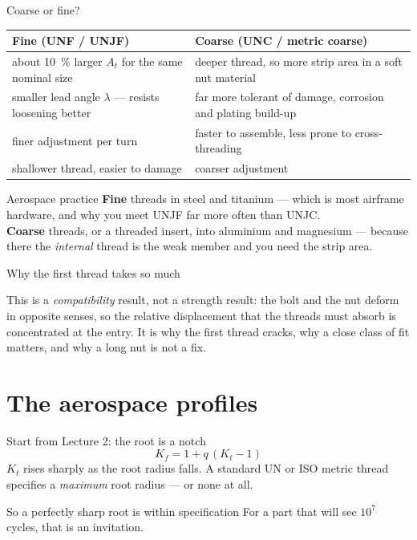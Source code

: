 \documentclass[aspectratio=169,10pt]{beamer}
\begin{document}
\begin{frame}{Coarse or fine?}
\centering\small
\begin{tabular}{@{}p{5.1cm}p{5.1cm}@{}}
\toprule
\textbf{Fine} (UNF / UNJF) & \textbf{Coarse} (UNC / metric coarse)\\
\midrule
about \SI{10}{\percent} larger $A_t$ for the same nominal size
  & deeper thread, so more strip area in a soft nut material\\[3pt]
smaller lead angle $\lambda$ --- resists loosening better
  & far more tolerant of damage, corrosion and plating build-up\\[3pt]
finer adjustment per turn
  & faster to assemble, less prone to cross-threading\\[3pt]
shallower thread, easier to damage & coarser adjustment\\
\bottomrule
\end{tabular}
\vfill
\raggedright
\begin{alertblock}{Aerospace practice}
\textbf{Fine} threads in steel and titanium --- which is most airframe hardware, and why you meet UNJF
far more often than UNJC.\\[4pt]
\textbf{Coarse} threads, or a threaded insert, into aluminium and magnesium --- because there the
\emph{internal} thread is the weak member and you need the strip area.
\end{alertblock}
\end{frame}

\begin{frame}{Why the first thread takes so much}
\centering
\resizebox{!}{5.0cm}{}
\vfill
\raggedright
{\small This is a \emph{compatibility} result, not a strength result: the bolt and the nut deform in
opposite senses, so the relative displacement that the threads must absorb is concentrated at the
entry. It is why the first thread cracks, why a close class of fit matters, and why a long nut is not
a fix.}
\end{frame}

\section{The aerospace profiles}

\begin{frame}{Start from Lecture 2: the root is a notch}
\[ K_f = 1 + q\,(K_t - 1) \]
\vfill
$K_t$ rises sharply as the root radius falls.
\vfill
A standard UN or ISO metric thread specifies a \emph{maximum} root radius --- or none at all.
\vfill
\begin{alertblock}{So a perfectly sharp root is within specification}
For a part that will see $10^7$ cycles, that is an invitation.
\end{alertblock}
\end{frame}
\end{document}

